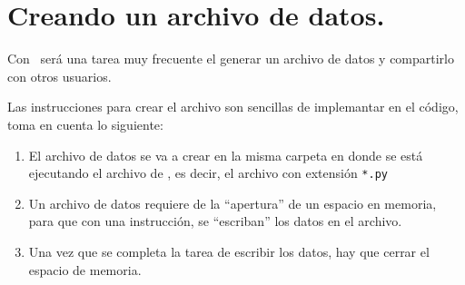 \section{Creando un archivo de datos.}
Con \python\ será una tarea muy frecuente el generar un archivo de datos y compartirlo con otros usuarios.
\par
Las instrucciones para crear el archivo son sencillas de implemantar en el código, toma en cuenta lo siguiente:
\begin{enumerate}
\item El archivo de datos se va a crear en la misma carpeta en donde se está ejecutando el archivo de \python, es decir, el archivo con extensión \texttt{*.py}
\item Un archivo de datos requiere de la \enquote{apertura} de un espacio en memoria, para que con una instrucción, se \enquote{escriban} los datos en el archivo.
\item Una vez que se completa la tarea de escribir los datos, hay que cerrar el espacio de memoria.
\end{enumerate}
